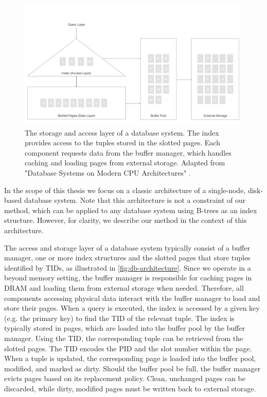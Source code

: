
\begin{figure}[htpb]
  \centering
  \includegraphics[width=0.99\textwidth]{figures/db_architecture.pdf}
  \caption{The storage and access layer of a database system. The index provides access to the tuples stored in the slotted pages. Each component requests data from the buffer manager, which handles caching and loading pages from external storage. Adapted from "Database Systems on Modern CPU Architectures" \cite{mdbs2024slides}.}
  \label{fig:db-architecture}
\end{figure}

In the scope of this thesis we focus on a classic architecture of a single-node, disk-based database system.
Note that this architecture is not a constraint of our method, which can be applied to any database system using B-trees as an index structure.
However, for clarity, we describe our method in the context of this architecture.

The access and storage layer of a database system typically consist of a buffer manager, one or more index structures and the slotted pages that store tuples identified by \ac{TID}s, as illustrated in \autoref{fig:db-architecture}.
Since we operate in a beyond memory setting, the buffer manager is responsible for caching pages in \ac{DRAM} and loading them from external storage when needed.
Therefore, all components accessing physical data interact with the buffer manager to load and store their pages.
When a query is executed, the index is accessed by a given key (e.g. the primary key) to find the \ac{TID} of the relevant tuple.
The index is typically stored in pages, which are loaded into the buffer pool by the buffer manager.
Using the \ac{TID}, the corresponding tuple can be retrieved from the slotted pages.
The \ac{TID} encodes the \ac{PID} and the slot number within the page.
When a tuple is updated, the corresponding page is loaded into the buffer pool, modified, and marked as dirty.
Should the buffer pool be full, the buffer manager evicts pages based on its replacement policy.
Clean, unchanged pages can be discarded, while dirty, modified pages must be written back to external storage.

